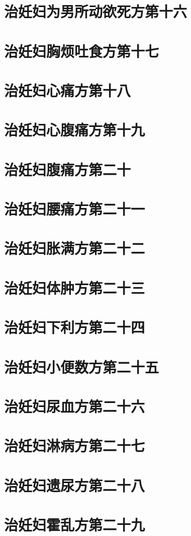 \documentclass[a4paper,12pt,UTF8,twoside]{ctexbook}
\begin{document}
\chapter{治妊妇为男所动欲死方第十六}
\chapter{治妊妇胸烦吐食方第十七}
\chapter{治妊妇心痛方第十八}
\chapter{治妊妇心腹痛方第十九}
\chapter{治妊妇腹痛方第二十}
\chapter{治妊妇腰痛方第二十一}
\chapter{治妊妇胀满方第二十二}
\chapter{治妊妇体肿方第二十三}
\chapter{治妊妇下利方第二十四}
\chapter{治妊妇小便数方第二十五}
\chapter{治妊妇尿血方第二十六}
\chapter{治妊妇淋病方第二十七}
\chapter{治妊妇遗尿方第二十八}
\chapter{治妊妇霍乱方第二十九}
\end{document}
